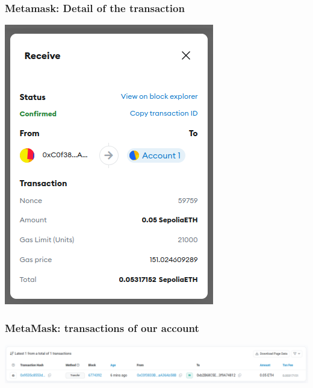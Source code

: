 \documentclass[11pt]{beamer}  %
\begin{document}
\begin{frame}\frametitle{Metamask: Detail of the transaction}

  \begin{center}
    \includegraphics[scale=0.4,clip=false]{pictures/metamask-faucet-transaction-details.png}
  \end{center}

\end{frame}

\begin{frame}\frametitle{MetaMask: transactions of our account}

  \begin{center}
    \includegraphics[width=\textwidth,clip=false]{pictures/metamask-faucet-transactions.png}
  \end{center}

\end{frame}
\end{document}

